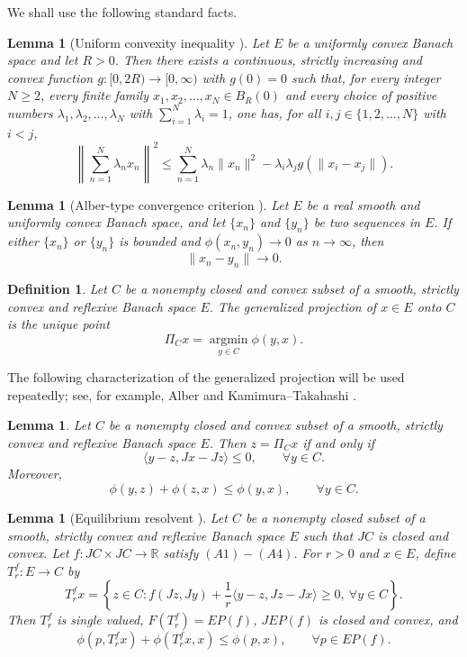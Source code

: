 \documentclass[10pt,a4paper]{amsart}
\newtheorem{lemma}[theorem]{Lemma}
\newtheorem{definition}[theorem]{Definition}
\numberwithin{equation}{section}
\begin{document}
We shall use the following standard facts. %


\begin{lemma}[Uniform convexity inequality \cite{KamimuraTakahashi2002}]\label{glemma}
Let $E$ be a uniformly convex Banach space and let $R>0$. Then there exists a continuous, strictly increasing and convex function $g:[0,2R)\to[0,\infty)$ with $g(0)=0$ such that, for every integer $N\geq2$, every finite family $x_1,x_2,\ldots,x_N\in B_R(0)$ and every choice of positive numbers $\lambda_1,\lambda_2,\ldots,\lambda_N$ with $\sum_{i=1}^{N}\lambda_i=1$, one has, for all $i,j\in\{1,2,\ldots,N\}$ with $i<j$,
\[
\left\|\sum_{n=1}^{N}\lambda_nx_n\right\|^2\leq \sum_{n=1}^{N}\lambda_n\|x_n\|^2-\lambda_i\lambda_jg(\|x_i-x_j\|).
\]
\end{lemma}

\begin{lemma}[Alber-type convergence criterion \cite{Alber1996,KamimuraTakahashi2002}]\label{phitozero}
Let $E$ be a real smooth and uniformly convex Banach space, and let $\{x_n\}$ and $\{y_n\}$ be two sequences in $E$. If either $\{x_n\}$ or $\{y_n\}$ is bounded and $\phi(x_n,y_n)\to 0$ as $n\to\infty$, then
\[
\|x_n-y_n\|\to 0.
\]
\end{lemma}


\begin{definition}
Let $C$ be a nonempty closed and convex subset of a smooth, strictly convex and reflexive Banach space $E$. The generalized projection of $x\in E$ onto $C$ is the unique point
\[
\Pi_Cx=\operatorname*{argmin}_{y\in C}\phi(y,x).
\]
\end{definition}

The following characterization of the generalized projection will be used repeatedly; see, for example, Alber \cite{Alber1996} and Kamimura--Takahashi \cite{KamimuraTakahashi2002}.

\begin{lemma}\label{projectionlemma}
Let $C$ be a nonempty closed and convex subset of a smooth, strictly convex and reflexive Banach space $E$. Then $z=\Pi_Cx$ if and only if
\[
\langle y-z,Jx-Jz\rangle\leq 0,\qquad \forall y\in C.
\]
Moreover,
\[
\phi(y,z)+\phi(z,x)\leq \phi(y,x),\qquad \forall y\in C.
\]
\end{lemma}


\begin{lemma}[Equilibrium resolvent \cite{TakahashiZembayashi2008}]\label{EPrezolvent}
Let $C$ be a nonempty closed subset of a smooth, strictly convex and reflexive Banach space $E$ such that $JC$ is closed and convex. Let $f:JC\times JC\to\mathbb{R}$ satisfy $(A1)-(A4)$. For $r>0$ and $x\in E$, define $T_r^f:E\to C$ by
\[
T_r^f x=\left\{z\in C:f(Jz,Jy)+\frac{1}{r}\langle y-z,Jz-Jx\rangle\geq 0,\ \forall y\in C\right\}.
\]
Then $T_r^f$ is single valued, $F(T_r^f)=EP(f)$, $JEP(f)$ is closed and convex, and
\[
\phi(p,T_r^f x)+\phi(T_r^f x,x)\leq \phi(p,x),\qquad \forall p\in EP(f).
\]
\end{lemma}
\end{document}

